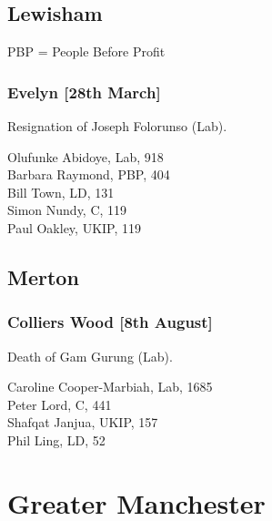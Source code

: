 \documentclass[a4paper,openany,10pt]{book}
\begin{document}
\subsection*{Lewisham}

PBP = People Before Profit

\subsubsection*{Evelyn \hspace*{\fill}\nolinebreak[1]%
\enspace\hspace*{\fill}
[28th March]}


Resignation of Joseph Folorunso (Lab).



Olufunke Abidoye, Lab, 918\\
Barbara Raymond, PBP, 404\\
Bill Town, LD, 131\\
Simon Nundy, C, 119\\
Paul Oakley, UKIP, 119\\


\subsection*{Merton}

\subsubsection*{Colliers Wood \hspace*{\fill}\nolinebreak[1]%
\enspace\hspace*{\fill}
[8th August]}


Death of Gam Gurung (Lab).



{Caroline Cooper-Marbiah}, Lab, 1685\\
Peter Lord, C, 441\\
Shafqat Janjua, UKIP, 157\\
Phil Ling, LD, 52\\


\vfill

\section[Greater Manchester]{{Greater Manchester}}
\end{document}
